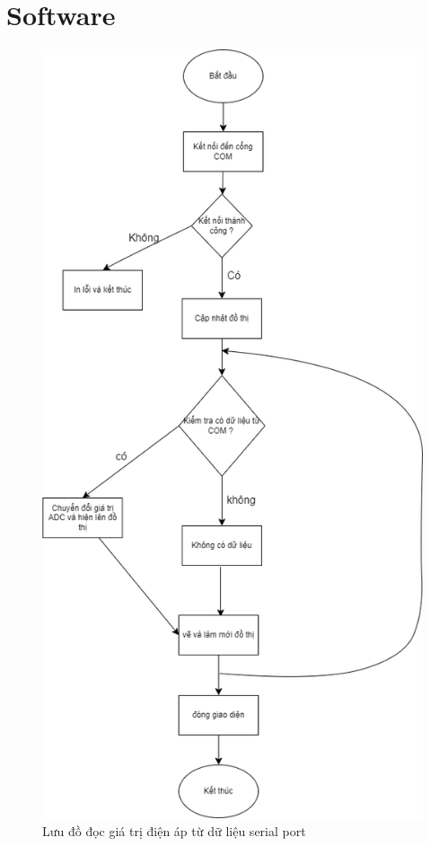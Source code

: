 \section{Software}

\begin{figure}[H]
	\centering
	\includegraphics[width=0.6\linewidth]{./diagram/software_diagram.drawio.png}
	\caption{Lưu đồ đọc giá trị điện áp từ dữ liệu serial port}
	\label{f_luu do doc gia tri dien ap tu du lieu serial port}
\end{figure}

